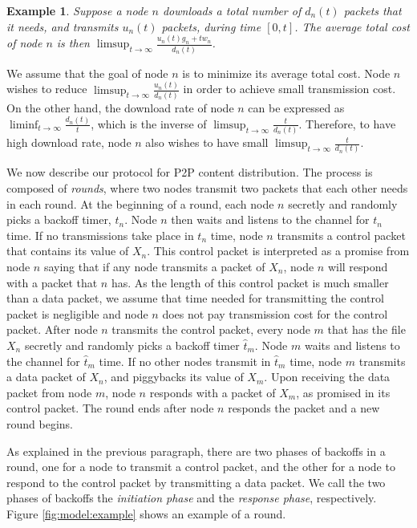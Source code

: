 \documentclass[11pt, conference]{IEEEtran}
\newtheorem{example}{Example}
\begin{document}
\begin{example}
Suppose a node $n$ downloads a total number of $d_n(t)$ packets that it needs, and transmits $u_n(t)$ packets, during time $[0,t]$. The average total cost of node $n$ is then $\limsup_{t\rightarrow\infty}\frac{u_n(t)g_n+tw_n}{d_n(t)}$.
\end{example}

We assume that the goal of node $n$ is to minimize its average total cost. Node $n$ wishes to reduce $\limsup_{t\rightarrow\infty}\frac{u_n(t)}{d_n(t)}$ in order to achieve small transmission cost. On the other hand, the download rate of node $n$ can be expressed as $\liminf_{t\rightarrow\infty}\frac{d_n(t)}{t}$, which is the inverse of $\limsup_{t\rightarrow\infty}\frac{t}{d_n(t)}$. Therefore, to have high download rate, node $n$ also wishes to have small $\limsup_{t\rightarrow\infty}\frac{t}{d_n(t)}$.

We now describe our protocol for P2P content distribution. The process is composed of \emph{rounds}, where  two nodes transmit two packets that each other needs in each round. At the beginning of a round, each node $n$ secretly and randomly picks a backoff timer, $t_n$. Node $n$ then waits and listens to the channel for $t_n$ time. If no transmissions take place in $t_n$ time, node $n$ transmits a control packet that contains its value of $X_n$. This control packet is interpreted as a promise from node $n$ saying that if any node transmits a packet of $X_n$, node $n$ will respond with a packet that $n$ has. As the length of this control packet is much smaller than a data packet, we assume that time needed for transmitting the control packet is negligible and node $n$ does not pay transmission cost for the control packet.  After node $n$ transmits the control packet, every node $m$ that has the file $X_n$ secretly and randomly picks a backoff timer $\hat{t}_m$. Node $m$ waits and listens to the channel for $\hat{t}_m$ time. If no other nodes transmit in $\hat{t}_m$ time, node $m$ transmits a data packet of $X_n$, and piggybacks its value of $X_m$. Upon receiving the data packet from node $m$, node $n$ responds with a packet of $X_m$, as promised in its control packet. The round ends after node $n$ responds the packet and a new round begins.

As explained in the previous paragraph, there are two phases of backoffs in a round, one for a node to transmit a control packet, and the other for a node to respond to the control packet by transmitting a data packet. We call the two phases of backoffs the \emph{initiation phase} and the \emph{response phase}, respectively. Figure \ref{fig:model:example} shows an example of a round.
\end{document}
